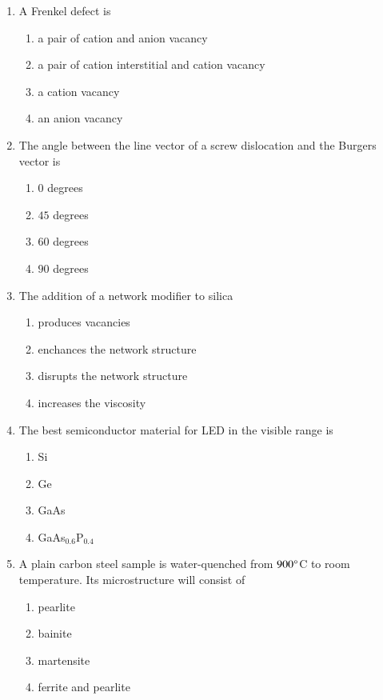 \documentclass[journal,12pt,onecolumn]{IEEEtran}
\theoremstyle{remark}
\begin{document}
\begin{enumerate}
\item A Frenkel defect is

\begin{enumerate}
	\item a pair of cation and anion vacancy
	\item a pair of cation interstitial and cation vacancy
	\item a cation vacancy
	\item an anion vacancy
\end{enumerate}

\item The angle between the line vector of a screw dislocation and the Burgers vector is

\begin{enumerate}
	\item $0$ degrees
	\item $45$ degrees
	\item $60$ degrees
	\item $90$ degrees
\end{enumerate}

\item The addition of a network modifier to silica

\begin{enumerate}
	\item produces vacancies
	\item enchances the network structure
	\item disrupts the network structure
	\item increases the viscosity
\end{enumerate}

\item The best semiconductor material for LED in the visible range is

\begin{enumerate}
	\item Si
	\item Ge
	\item GaAs
	\item GaAs$_{0.6}$P$_{0.4}$
\end{enumerate}

\item A plain carbon steel sample is water-quenched from $900\degree$C to room temperature. Its microstructure will consist of

\begin{enumerate}
	\item pearlite
	\item bainite
	\item martensite
	\item ferrite and pearlite
\end{enumerate}


\end{enumerate}
\end{document}
